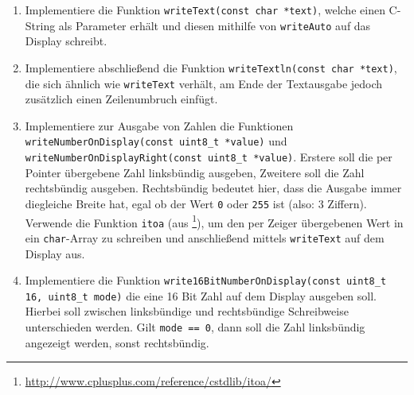 \begin{enumerate}
\item 
Implementiere die Funktion \lstinline|writeText(const char *text)|, welche einen C-String als Parameter erhält und diesen mithilfe von \lstinline|writeAuto| auf das Display schreibt.

\item 
Implementiere abschließend die Funktion \lstinline|writeTextln(const char *text)|, die sich ähnlich wie \lstinline|writeText| verhält, am Ende der Textausgabe jedoch zusätzlich einen Zeilenumbruch einfügt.

\item 
Implementiere zur Ausgabe von Zahlen die Funktionen \lstinline|writeNumberOnDisplay(const uint8_t *value)| und \lstinline|writeNumberOnDisplayRight(const uint8_t *value)|.
Erstere soll die per Pointer übergebene Zahl linksbündig ausgeben, Zweitere soll die Zahl rechtsbündig ausgeben.
Rechtsbündig bedeutet hier, dass die Ausgabe immer diegleiche Breite hat, egal ob der Wert \lstinline|0| oder \lstinline|255| ist (also: 3 Ziffern).
Verwende die Funktion \lstinline|itoa| (aus \footnote{\url{http://www.cplusplus.com/reference/cstdlib/itoa/}}), um den per Zeiger übergebenen Wert in ein \lstinline|char|-Array zu schreiben und anschließend mittels \lstinline|writeText| auf dem Display aus.

\item 
Implementiere die Funktion \lstinline|write16BitNumberOnDisplay(const uint8_t 16, uint8_t mode)| die eine 16 Bit Zahl auf dem Display ausgeben soll. Hierbei soll zwischen linksbündige und rechtsbündige Schreibweise unterschieden werden. Gilt \lstinline|mode == 0|, dann soll die Zahl linksbündig angezeigt werden, sonst rechtsbündig. 
\end{enumerate}




